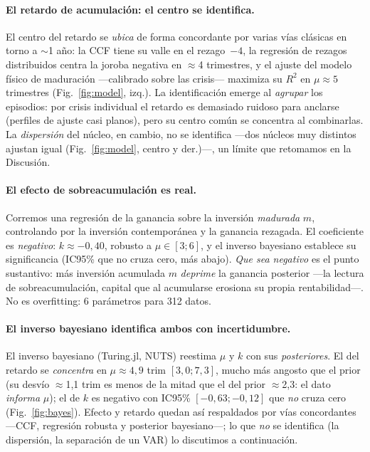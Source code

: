 \documentclass[11pt]{article}
\begin{document}
\paragraph{El retardo de acumulación: el centro se identifica.}
El centro del retardo se \emph{ubica} de forma concordante por varias vías clásicas en torno a
$\sim$1 año: la CCF tiene su valle en el rezago~$-4$, la regresión de rezagos distribuidos centra la
joroba negativa en $\approx$4 trimestres, y el ajuste del modelo físico de maduración ---calibrado sobre las
crisis--- maximiza su $R^2$ en $\mu\approx5$ trimestres (Fig.~\ref{fig:model}, izq.). La identificación
emerge al \emph{agrupar} los episodios: por crisis individual el retardo es demasiado ruidoso para
anclarse (perfiles de ajuste casi planos), pero su centro común se concentra al combinarlas. La
\emph{dispersión} del núcleo, en cambio, no se identifica ---dos núcleos muy distintos ajustan
igual (Fig.~\ref{fig:model}, centro y der.)---, un límite que retomamos en la Discusión.

\paragraph{El efecto de sobreacumulación es real.}
Corremos una regresión de la ganancia sobre la inversión \emph{madurada} $m$, controlando por la
inversión contemporánea y la ganancia rezagada. El coeficiente es \emph{negativo}:
$k\approx-0{,}40$, robusto a $\mu\in[3;6]$, y el inverso bayesiano establece su significancia
(IC95\% que no cruza cero, más abajo). \emph{Que sea negativo} es el punto sustantivo: más
inversión acumulada $m$ \emph{deprime} la ganancia posterior ---la lectura de sobreacumulación,
capital que al acumularse erosiona su propia rentabilidad---. No es overfitting: 6 parámetros para 312 datos.

\paragraph{El inverso bayesiano identifica ambos con incertidumbre.}
El inverso bayesiano (Turing.jl, NUTS) reestima $\mu$ y $k$ con sus \emph{posteriores}. El del
retardo se \emph{concentra} en $\mu\approx4{,}9$ trim $[3{,}0;7{,}3]$, mucho más angosto que el
prior (su desvío $\approx$1,1 trim es menos de la mitad que el del prior $\approx$2,3: el dato
\emph{informa} $\mu$); el de $k$ es negativo con IC95\% $[-0{,}63;-0{,}12]$ que \emph{no} cruza cero
(Fig.~\ref{fig:bayes}). Efecto y retardo quedan así respaldados por vías concordantes ---CCF,
regresión robusta y posterior bayesiano---; lo que \emph{no} se identifica (la dispersión, la
separación de un VAR) lo discutimos a continuación.
\end{document}
